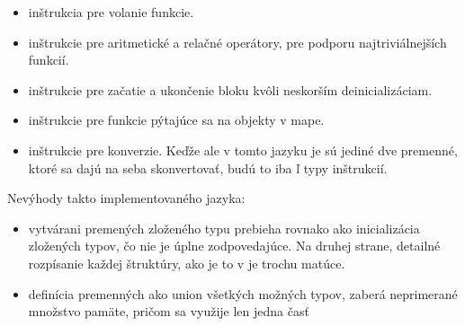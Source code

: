 \begin{itemize}
\item inštrukcia pre volanie funkcie.
\item inštrukcie pre aritmetické a relačné operátory, pre podporu najtriviálnejších funkcií.
\item inštrukcie pre začatie a ukončenie bloku kvôli neskorším deinicializáciam.
\item inštrukcie pre funkcie pýtajúce sa na objekty v mape.
\item inštrukcie pre konverzie. Keďže ale v tomto jazyku je sú jediné dve premenné, ktoré sa dajú na seba skonvertovať, budú to iba ľ typy inštrukcií.
\end{itemize}
Nevýhody takto implementovaného jazyka:
\begin{itemize}
\item vytvárani premených zloženého typu prebieha rovnako ako inicializácia zložených typov, čo nie je úplne zodpovedajúce. Na druhej strane, detailné rozpísanie každej štruktúry, ako je to v je trochu matúce.\\
\item definícia premenných ako union všetkých možných typov, zaberá neprimerané množstvo pamäte, pričom sa využije len jedna časť
\end{itemize}
